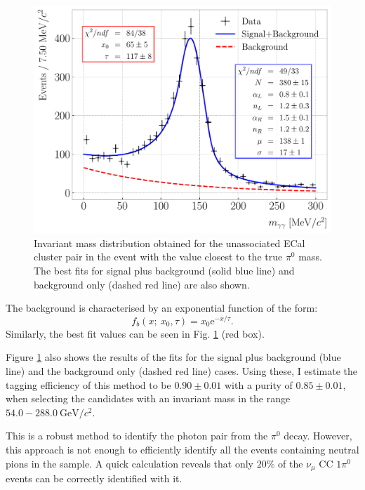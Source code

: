 \begin{figure}[t]
    \centering
    \includegraphics[width=.80\linewidth]{Images/GAr_selection/numuCC_1pizero_selection.pdf}
    \caption[Invariant mass distribution obtained for the unassociated ECal cluster pair in the event with the value closest to the true $\pi^{0}$ mass.]{Invariant mass distribution obtained for the unassociated ECal cluster pair in the event with the value closest to the true $\pi^{0}$ mass. The best fits for signal plus background (solid blue line) and background only (dashed red line) are also shown.}
    \label{fig:pizero_invariant_mass}
\end{figure}

The background is characterised by an exponential function of the form:
\begin{equation}
    f_{b} (x; ~x_{0}, \tau) = x_{0} \mathrm{e}^{-x/\tau}.
\end{equation}
Similarly, the best fit values can be seen in Fig. \ref{fig:pizero_invariant_mass} (red box).

Figure \ref{fig:pizero_invariant_mass} also shows the results of the fits for the signal plus background (blue line) and the background only (dashed red line) cases. Using these, I estimate the tagging efficiency of this method to be $0.90 \pm 0.01$ with a purity of $0.85 \pm 0.01$, when selecting the candidates with an invariant mass in the range $54.0-288.0~\mathrm{GeV}/c^{2}$.

This is a robust method to identify the photon pair from the $\pi^{0}$ decay. However, this approach is not enough to efficiently identify all the events containing neutral pions in the sample. A quick calculation reveals that only $20\%$ of the $\nu_{\mu}$ CC $1\pi^{0}$ events can be correctly identified with it.

